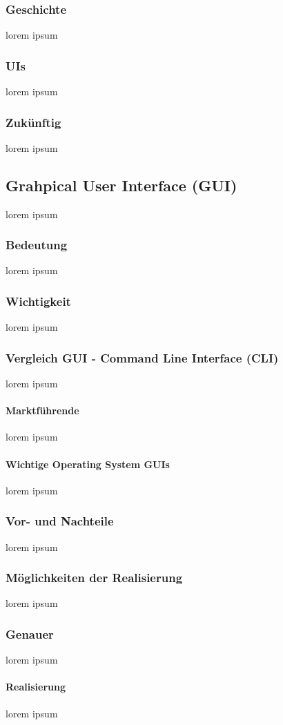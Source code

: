 \documentclass[10pt,a4paper]{report}
\begin{document}
\subsubsection{Geschichte}
lorem ipsum
\subsubsection{UIs}
lorem ipsum 
\subsubsection{Zukünftig}
lorem ipsum 
\subsection{Grahpical User Interface (GUI)}
lorem ipsum
\subsubsection{Bedeutung}
lorem ipsum
\subsubsection{Wichtigkeit}
lorem ipsum
\subsubsection{Vergleich GUI - Command Line Interface (CLI)}
lorem ipsum
\paragraph{Marktführende}
lorem ipsum
\paragraph{Wichtige Operating System GUIs}
lorem ipsum
\subsubsection{Vor- und Nachteile}
lorem ipsum
\subsubsection{Möglichkeiten der Realisierung}
lorem ipsum
\subsubsection{Genauer}
lorem ipsum
\paragraph{Realisierung}
lorem ipsum
\end{document}
